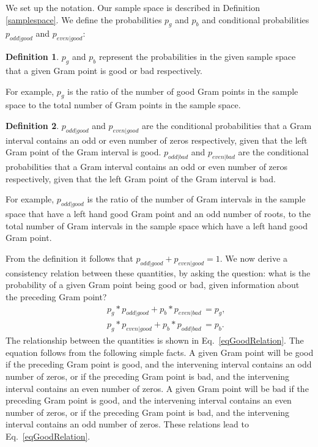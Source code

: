 \documentclass[twoside]{article}
\theoremstyle{definition}
\newtheorem{defn}{Definition}
\begin{document}
We set up the notation. Our sample space is  described in Definition \ref{samplespace}.  We define the probabilities $p_g$ and  $p_b$ and conditional probabilities $p_{odd|good}$ and $p_{even|good}$:
\begin{defn}\label{pgood}
$p_g$ and $p_b$ represent the probabilities in the given sample space that a given Gram point is good or bad respectively. 
\end{defn} 
For example,  $p_g$ is the ratio of the number of good Gram points in the sample space to the total number of Gram points in the sample space.
\begin{defn}\label{poddgood}
$p_{odd|good}$ and $p_{even|good}$ are the conditional probabilities that a Gram interval contains an odd or even number of zeros respectively, given that the left Gram point of the Gram interval is good. $p_{odd|bad}$ and $p_{even|bad}$ are the conditional probabilities that a Gram interval contains an odd or even number of zeros respectively, given that the left Gram point of the Gram interval is bad.
\end{defn} 
For example,  $p_{odd|good}$ is the ratio of the number of  Gram intervals in the sample space that have a left hand good Gram point and an odd number of roots, to the total number of Gram intervals in the sample space which have a left hand good Gram point.

From the definition it follows that $p_{odd|good} + p_{even|good} = 1$.  
We now derive a consistency relation between these quantities, by asking the question: what is the probability of a given Gram point being good or bad, given information about the preceding Gram point? 
\begin{eqnarray}
&&p_g*p_{odd|good}  + p_b*p_{even|bad}\, =  p_g,\nonumber\\
&&p_g*p_{even|good} + p_b*p_{odd|bad}\, = p_b.
\label{eqGoodRelation}
\end{eqnarray}
The relationship between the quantities is shown in Eq.~\ref{eqGoodRelation}. The equation follows from the following simple facts. A given Gram point will be good if the preceding Gram point is good, and the intervening interval contains an odd number of zeros, or if the preceding Gram point is bad, and the intervening interval contains an even number of zeros. A given Gram point will be bad if the preceding Gram point is good, and the intervening interval contains an even number of zeros, or if the preceding Gram point is bad, and the intervening interval contains an odd number of zeros. These relations lead to Eq.~\ref{eqGoodRelation}. 
\end{document}
